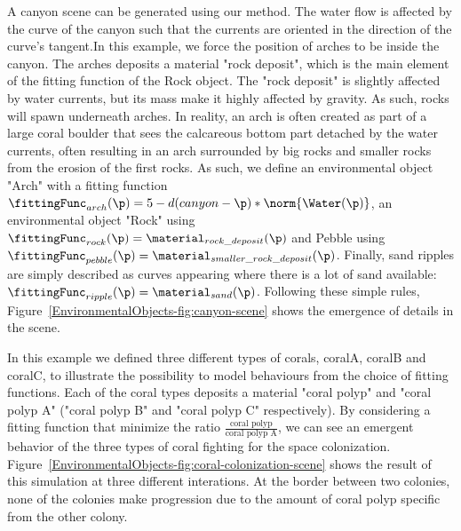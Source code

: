 A canyon scene can be generated using our method. The water flow is affected by the curve of the canyon such that the currents are oriented in the direction of the curve's tangent.In this example, we force the position of arches to be inside the canyon. The arches deposits a material "rock deposit", which is the main element of the fitting function of the Rock object. The "rock deposit" is slightly affected by water currents, but its mass make it highly affected by gravity. As such, rocks will spawn underneath arches. In reality, an arch is often created as part of a large coral boulder that sees the calcareous bottom part detached by the water currents, often resulting in an arch surrounded by big rocks and smaller rocks from the erosion of the first rocks.
As such, we define an environmental object "Arch" with a fitting function $\fittingFunc_{arch}(\p) = 5 - d(canyon - \p) * \norm{\Water(\p)}$, an environmental object "Rock" using $\fittingFunc_{rock}(\p) = \material_{rock\_deposit}(\p)$ and Pebble using $\fittingFunc_{pebble}(\p) = \material_{smaller\_rock\_deposit}(\p)$. Finally, sand ripples are simply described as curves appearing where there is a lot of sand available: $\fittingFunc_{ripple}(\p) = \material_{sand}(\p)$.
Following these simple rules, Figure~\ref{EnvironmentalObjects-fig:canyon-scene} shows the emergence of details in the scene. 

In this example we defined three different types of corals, coralA, coralB and coralC, to illustrate the possibility to model behaviours from the choice of fitting functions. Each of the coral types deposits a material "coral polyp" and "coral polyp A" ("coral polyp B" and "coral polyp C" respectively). By considering a fitting function that minimize the ratio $\frac{\text{coral polyp}}{\text{coral polyp A}}$, we can see an emergent behavior of the three types of coral fighting for the space colonization.
Figure~\ref{EnvironmentalObjects-fig:coral-colonization-scene} shows the result of this simulation at three different interations. At the border between two colonies, none of the colonies make progression due to the amount of coral polyp specific from the other colony.

